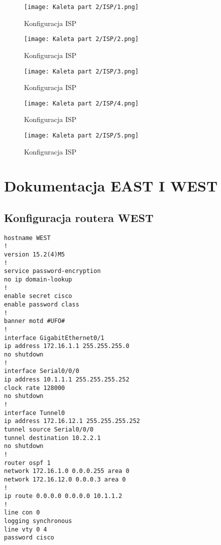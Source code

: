 \documentclass[12pt,twoside,a4paper,openany]{article}
\begin{document}
\begin{figure}[h]
    \centering
    \begin{minipage}{0.49\textwidth}
        \centering
        \texttt{[image: Kaleta part 2/ISP/1.png]}
        \caption{Konfiguracja ISP}
        \label{fig:ISP-1}
    \end{minipage}
    \hfill
    \begin{minipage}{0.49\textwidth}
        \centering
        \texttt{[image: Kaleta part 2/ISP/2.png]}
        \caption{Konfiguracja ISP}
        \label{fig:ISP-2}
    \end{minipage}
\end{figure}
\begin{figure}[h]
    \centering
    \begin{minipage}{0.49\textwidth}
        \centering
        \texttt{[image: Kaleta part 2/ISP/3.png]}
        \caption{Konfiguracja ISP}
        \label{fig:ISP-3}
    \end{minipage}
    \hfill
    \begin{minipage}{0.49\textwidth}
        \centering
        \texttt{[image: Kaleta part 2/ISP/4.png]}
        \caption{Konfiguracja ISP}
        \label{fig:ISP-4}
    \end{minipage}
\end{figure}

\begin{figure}[h]
    \centering
    \texttt{[image: Kaleta part 2/ISP/5.png]}
    \caption{Konfiguracja ISP}
    \label{fig:ISP-5}
\end{figure}


\clearpage
\section{Dokumentacja EAST I WEST}
\subsection*{Konfiguracja routera WEST}
\begin{lstlisting}[caption={Konfiguracja routera WEST}, label={lst:west-config}]
hostname WEST
!
version 15.2(4)M5
!
service password-encryption
no ip domain-lookup
!
enable secret cisco
enable password class
!
banner motd #UFO#
!
interface GigabitEthernet0/1
ip address 172.16.1.1 255.255.255.0
no shutdown
!
interface Serial0/0/0
ip address 10.1.1.1 255.255.255.252
clock rate 128000
no shutdown
!
interface Tunnel0
ip address 172.16.12.1 255.255.255.252
tunnel source Serial0/0/0
tunnel destination 10.2.2.1
no shutdown
!
router ospf 1
network 172.16.1.0 0.0.0.255 area 0
network 172.16.12.0 0.0.0.3 area 0
!
ip route 0.0.0.0 0.0.0.0 10.1.1.2
!
line con 0
logging synchronous
line vty 0 4
password cisco

\end{lstlisting}
\end{document}
